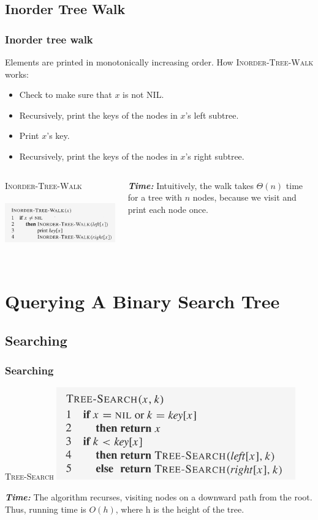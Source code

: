 \documentclass[notes,serif]{beamer}
\begin{document}
\subsection{Inorder Tree Walk}
\begin{frame}
\frametitle{Inorder tree walk}
    Elements are printed in monotonically increasing order.
    How \textsc{Inorder-Tree-Walk} works:
  \begin{itemize}
    \item Check to make sure that $x$ is not NIL.
    \item Recursively, print the keys of the nodes in $x$'s left subtree.
    \item Print $x$'s key.
    \item Recursively, print the keys of the nodes in $x$'s right subtree.
  \end{itemize}
  \begin{columns}
  \begin{block}{\textsc{Inorder-Tree-Walk}}
    \includegraphics[height=2.7cm]{12-inorder_tree_walk}
  \end{block}

  \begin{block}{}
  {\bf\em Time:} Intuitively, the walk takes $\Theta(n)$ time for a tree with $n$ nodes, because we
visit and print each node once.
  \end{block}
  \end{columns}
\end{frame}

\section{Querying A Binary Search Tree}
\subsection{Searching}
\begin{frame}
\frametitle{Searching}
  \begin{block}{\textsc{Tree-Search}}
    \includegraphics[height=4cm]{12-tree_search}
  \end{block}

  \begin{block}{}
  {\bf\em Time:} The algorithm recurses, visiting nodes on a downward path from the root.
Thus, running time is $O(h)$, where h is the height of the tree.
  \end{block}
\end{frame}
\end{document}
